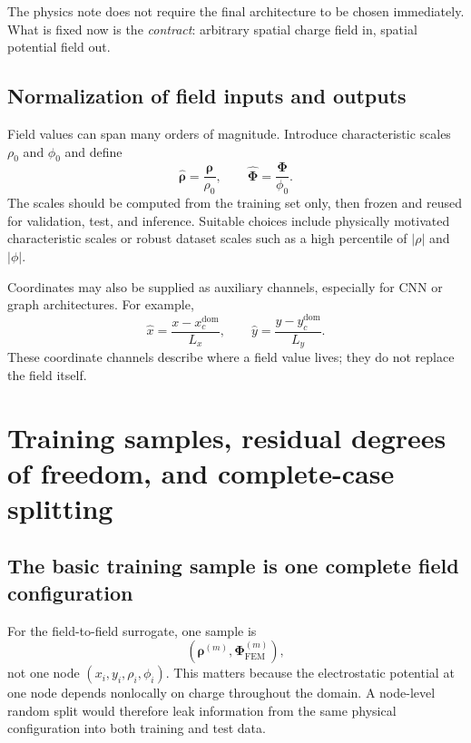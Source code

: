 \documentclass[11pt]{article}
\begin{document}
The physics note does not require the final architecture to be chosen immediately. What is fixed now is the \emph{contract}: arbitrary spatial charge field in, spatial potential field out.

\subsection{Normalization of field inputs and outputs}

Field values can span many orders of magnitude. Introduce characteristic scales $\rho_0$ and $\phi_0$ and define
\begin{equation}
\hat{\bm{\rho}}=\frac{\bm{\rho}}{\rho_0},
\qquad
\hat{\bm{\Phi}}=\frac{\bm{\Phi}}{\phi_0}.
\end{equation}
The scales should be computed from the training set only, then frozen and reused for validation, test, and inference. Suitable choices include physically motivated characteristic scales or robust dataset scales such as a high percentile of $|\rho|$ and $|\phi|$.

Coordinates may also be supplied as auxiliary channels, especially for CNN or graph architectures. For example,
\begin{equation}
\hat{x}=\frac{x-x_c^{\mathrm{dom}}}{L_x},\qquad
\hat{y}=\frac{y-y_c^{\mathrm{dom}}}{L_y}.
\end{equation}
These coordinate channels describe where a field value lives; they do not replace the field itself.

\section{Training samples, residual degrees of freedom, and complete-case splitting}

\subsection{The basic training sample is one complete field configuration}

For the field-to-field surrogate, one sample is
\begin{equation}
\left(\bm{\rho}^{(m)},\bm{\Phi}_{\mathrm{FEM}}^{(m)}\right),
\end{equation}
not one node $(x_i,y_i,\rho_i,\phi_i)$. This matters because the electrostatic potential at one node depends nonlocally on charge throughout the domain. A node-level random split would therefore leak information from the same physical configuration into both training and test data.
\end{document}
